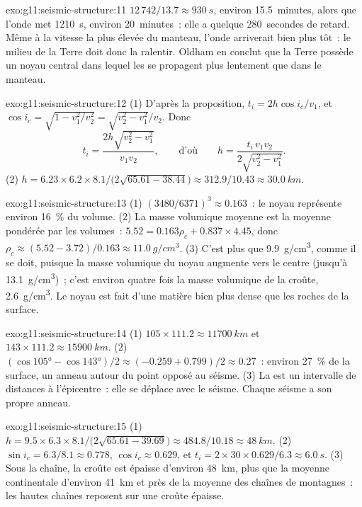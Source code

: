 \begin{solution}{exo:g11:seismic-structure:11}
$12\,742/13.7 \approx \qty{930}{s}$, environ 15.5~minutes, alors que l'onde
met \qty{1210}{s}, environ 20~minutes~: elle a quelque 280~secondes de
retard. Même à la vitesse la plus élevée du manteau, l'onde arriverait bien
plus tôt~: le milieu de la Terre doit donc la ralentir. Oldham en conclut
que la Terre possède un noyau central dans lequel les  se propagent
plus lentement que dans le manteau.
\end{solution}

\begin{solution}{exo:g11:seismic-structure:12}
(1) D'après la proposition, $t_i = 2h\cos i_c/v_1$, et $\cos i_c = \sqrt{1 -
v_1^2/v_2^2} = \sqrt{v_2^2 - v_1^2}/v_2$. Donc
\[
  t_i = \frac{2h\sqrt{v_2^2 - v_1^2}}{v_1 v_2},
  \qquad\text{d'où}\qquad
  h = \frac{t_i\,v_1 v_2}{2\sqrt{v_2^2 - v_1^2}}.
\]
(2) $h = 6.23 \times 6.2 \times 8.1/\bigl(2\sqrt{65.61 -
38.44}\bigr) \approx 312.9/10.43 \approx \qty{30.0}{km}$.
\end{solution}

\begin{solution}{exo:g11:seismic-structure:13}
(1) $(3480/6371)^3 \approx 0.163$~: le noyau représente environ
\qty{16}{\percent} du volume. (2) La masse volumique moyenne est la moyenne
pondérée par les volumes~: $5.52 = 0.163
\rho_c + 0.837 \times 4.45$, donc $\rho_c \approx (5.52 - 3.72)/0.163 \approx
\qty{11.0}{g/cm^3}$. (3) C'est plus que \qty{9.9}{g/cm^3}, comme il se
doit, puisque la masse volumique du noyau augmente vers le centre (jusqu'à
\qty{13.1}{g/cm^3})~; c'est environ quatre fois la masse volumique de la
croûte, \qty{2.6}{g/cm^3}. Le noyau est fait d'une matière bien plus dense
que les roches de la surface.
\end{solution}

\begin{solution}{exo:g11:seismic-structure:14}
(1) $105 \times 111.2 \approx \qty{11700}{km}$ et $143 \times 111.2 \approx
\qty{15900}{km}$. (2) $(\cos\ang{105} - \cos\ang{143})/2 \approx (-0.259 +
0.799)/2 \approx 0.27$~: environ \qty{27}{\percent} de la surface, un anneau
autour du point opposé au séisme. (3) La  est un intervalle de
distances à l'épicentre~: elle se déplace avec le séisme. Chaque séisme a
son propre anneau.
\end{solution}

\begin{solution}{exo:g11:seismic-structure:15}
(1) $h = 9.5 \times 6.3 \times 8.1/\bigl(2\sqrt{65.61 - 39.69}\bigr) \approx
484.8/10.18 \approx \qty{48}{km}$. (2) $\sin i_c = 6.3/8.1 \approx 0.778$,
$\cos i_c \approx 0.629$, et $t_i = 2 \times 30 \times 0.629/6.3 \approx
\qty{6.0}{s}$. (3) Sous la chaîne, la croûte est épaisse d'environ
\qty{48}{km}, plus que la moyenne continentale d'environ \qty{41}{km} et
près de la moyenne des chaînes de montagnes~: les hautes chaînes reposent
sur une croûte épaisse.
\end{solution}

